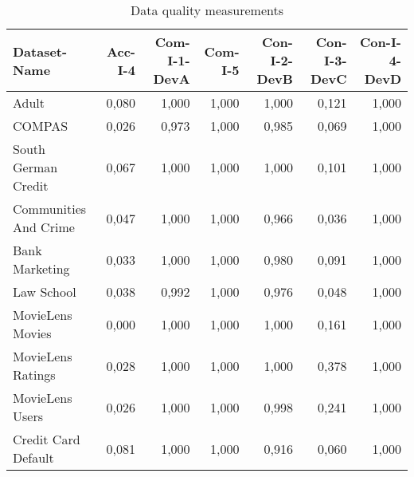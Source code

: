 \begin{table}[t]
\caption{Data quality measurements}
\label{tab:dataquality}
\begin{tabular}{|p{2cm}|r|r|r|r|r|r|}
\hline
Dataset-Name & Acc-I-4 & Com-I-1-DevA & Com-I-5 & Con-I-2-DevB & Con-I-3-DevC & Con-I-4-DevD \\
\hline
Adult & 0,080\cellcolor[HTML]{FDD9CA}& 1,000\cellcolor[HTML]{FEE0D2}& 1,000\cellcolor[HTML]{FEE0D2}& 1,000\cellcolor[HTML]{FEE0D2}& 0,121\cellcolor[HTML]{FDD6C6}& 1,000\cellcolor[HTML]{FEE0D2}\\
COMPAS & 0,026\cellcolor[HTML]{FDDDCF}& 0,973\cellcolor[HTML]{FDDDCF}& 1,000\cellcolor[HTML]{FEE0D2}& 0,985\cellcolor[HTML]{FDDED0}& 0,069\cellcolor[HTML]{FDDACB}& 1,000\cellcolor[HTML]{FEE0D2}\\
South German Credit & 0,067\cellcolor[HTML]{FDDACB}& 1,000\cellcolor[HTML]{FEE0D2}& 1,000\cellcolor[HTML]{FEE0D2}& 1,000\cellcolor[HTML]{FEE0D2}& 0,101\cellcolor[HTML]{FDD8C8}& 1,000\cellcolor[HTML]{FEE0D2}\\
Communities And Crime & 0,047\cellcolor[HTML]{FDDCCD}& 1,000\cellcolor[HTML]{FEE0D2}& 1,000\cellcolor[HTML]{FEE0D2}& 0,966\cellcolor[HTML]{FDDDCE}& 0,036\cellcolor[HTML]{FDDDCE}& 1,000\cellcolor[HTML]{FEE0D2}\\
Bank Marketing & 0,033\cellcolor[HTML]{FDDDCE}& 1,000\cellcolor[HTML]{FEE0D2}& 1,000\cellcolor[HTML]{FEE0D2}& 0,980\cellcolor[HTML]{FDDED0}& 0,091\cellcolor[HTML]{FDD8C9}& 1,000\cellcolor[HTML]{FEE0D2}\\
Law School & 0,038\cellcolor[HTML]{FDDDCE}& 0,992\cellcolor[HTML]{FDDFD1}& 1,000\cellcolor[HTML]{FEE0D2}& 0,976\cellcolor[HTML]{FDDECF}& 0,048\cellcolor[HTML]{FDDCCD}& 1,000\cellcolor[HTML]{FEE0D2}\\
MovieLens Movies & 0,000\cellcolor[HTML]{FEE0D2}& 1,000\cellcolor[HTML]{FEE0D2}& 1,000\cellcolor[HTML]{FEE0D2}& 1,000\cellcolor[HTML]{FEE0D2}& 0,161\cellcolor[HTML]{FDD3C2}& 1,000\cellcolor[HTML]{FEE0D2}\\
MovieLens Ratings & 0,028\cellcolor[HTML]{FDDDCF}& 1,000\cellcolor[HTML]{FEE0D2}& 1,000\cellcolor[HTML]{FEE0D2}& 1,000\cellcolor[HTML]{FEE0D2}& 0,378\cellcolor[HTML]{FDC2AD}& 1,000\cellcolor[HTML]{FEE0D2}\\
MovieLens Users & 0,026\cellcolor[HTML]{FDDDCF}& 1,000\cellcolor[HTML]{FEE0D2}& 1,000\cellcolor[HTML]{FEE0D2}& 0,998\cellcolor[HTML]{FDDFD1}& 0,241\cellcolor[HTML]{FDCDBA}& 1,000\cellcolor[HTML]{FEE0D2}\\
Credit Card Default & 0,081\cellcolor[HTML]{FDD9CA}& 1,000\cellcolor[HTML]{FEE0D2}& 1,000\cellcolor[HTML]{FEE0D2}& 0,916\cellcolor[HTML]{FDD9C9}& 0,060\cellcolor[HTML]{FDDBCC}& 1,000\cellcolor[HTML]{FEE0D2}\\
\hline
\end{tabular}
\end{table}
